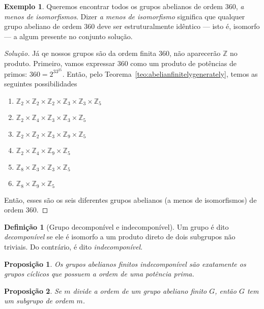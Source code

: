 \documentclass[a4paper,12pt]{report}
\theoremstyle{plain}
\newtheorem{proposicao}{Proposição}[section]
\theoremstyle{definition}
\newtheorem{definicao}{Definição}[section]
\newtheorem{exemplo}{Exemplo}[section]
\newenvironment{solucao}
{\renewcommand\qedsymbol{$\triangle$}\begin{proof}[Solução]}{\end{proof}}
\begin{document}
\begin{exemplo}
	Queremos encontrar todos os grupos abelianos de ordem 360, \emph{a menos de isomorfismos}. Dizer \emph{a menos de isomorfismo} significa que qualquer grupo abeliano de ordem 360 deve ser estruturalmente idêntico --- isto é, isomorfo --- a algum presente no conjunto solução.
	\begin{solucao}
		Já qe nossos grupos são da ordem finita 360, não aparecerão $\mathbb{Z}$ no produto. Primeiro, vamos expressar 360 como um produto de potências de primos: $360 = 2^33^25$. Então, pelo Teorema~\ref{teo:abelianfinitelygenerately}, temos as seguintes possibilidades
		\begin{enumerate}
			\item $\mathbb{Z}_2\times\mathbb{Z}_2\times\mathbb{Z}_2\times\mathbb{Z}_3\times\mathbb{Z}_3\times\mathbb{Z}_5$
			\item 	$\mathbb{Z}_2\times\mathbb{Z}_4\times\mathbb{Z}_3\times\mathbb{Z}_3\times\mathbb{Z}_5$ 
			\item 	$\mathbb{Z}_2\times\mathbb{Z}_2\times\mathbb{Z}_3\times\mathbb{Z}_9\times\mathbb{Z}_5$ 
			\item $\mathbb{Z}_2\times\mathbb{Z}_4\times\mathbb{Z}_9\times\mathbb{Z}_5$
			\item $\mathbb{Z}_8\times\mathbb{Z}_3\times\mathbb{Z}_3\times\mathbb{Z}_5$ 
			\item $\mathbb{Z}_8\times\mathbb{Z}_9\times\mathbb{Z}_5$ 
		\end{enumerate}
		
	Então, esses são os seis diferentes grupos abelianos (a menos de isomorfismos) de ordem 360.
	\end{solucao}
\end{exemplo}

\begin{definicao}[Grupo decomponível e indecomponível]
	Um grupo é dito \emph{decomponível} se ele é isomorfo a um produto direto de dois subgrupos não triviais. Do contrário, é dito \emph{indecomponível}.
\end{definicao}

\begin{proposicao}
	Os grupos abelianos finitos indecomponível são exatamente os grupos cíclicos que possuem a ordem de uma potência prima.
\end{proposicao}

\begin{proposicao}
	Se $m$ divide a ordem de um grupo abeliano finito $G$, então $G$ tem um subgrupo de ordem $m$.	
\end{proposicao}
\end{document}
